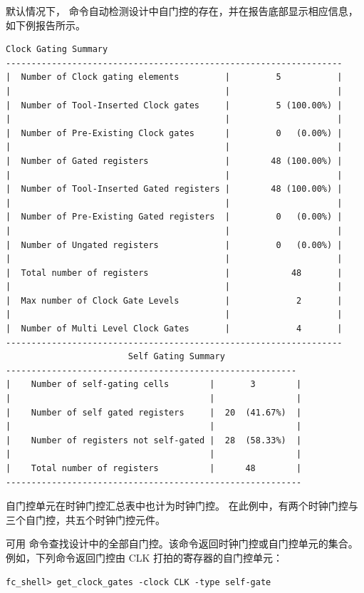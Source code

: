 默认情况下， 命令自动检测设计中自门控的存在，并在报告底部显示相应信息，如下例报告所示。

\begin{lstlisting}[caption={含自门控汇总的时钟门控报告}]
                     Clock Gating Summary
------------------------------------------------------------------
|  Number of Clock gating elements         |         5           |
|                                          |                     |
|  Number of Tool-Inserted Clock gates     |         5 (100.00%) |
|                                          |                     |
|  Number of Pre-Existing Clock gates      |         0   (0.00%) |
|                                          |                     |
|  Number of Gated registers               |        48 (100.00%) |
|                                          |                     |
|  Number of Tool-Inserted Gated registers |        48 (100.00%) |
|                                          |                     |
|  Number of Pre-Existing Gated registers  |         0   (0.00%) |
|                                          |                     |
|  Number of Ungated registers             |         0   (0.00%) |
|                                          |                     |
|  Total number of registers               |            48       |
|                                          |                     |
|  Max number of Clock Gate Levels         |             2       |
|                                          |                     |
|  Number of Multi Level Clock Gates       |             4       |
------------------------------------------------------------------
                        Self Gating Summary
---------------------------------------------------------
|    Number of self-gating cells        |       3        |
|                                       |                |
|    Number of self gated registers     |  20  (41.67%)  |
|                                       |                |
|    Number of registers not self-gated |  28  (58.33%)  |
|                                       |                |
|    Total number of registers          |      48        |
----------------------------------------------------------
\end{lstlisting}

自门控单元在时钟门控汇总表中也计为时钟门控。
在此例中，有两个时钟门控与三个自门控，共五个时钟门控元件。

可用  命令查找设计中的全部自门控。该命令返回时钟门控或自门控单元的集合。
例如，下列命令返回门控由 CLK 打拍的寄存器的自门控单元：
\begin{lstlisting}
fc_shell> get_clock_gates -clock CLK -type self-gate
\end{lstlisting}

